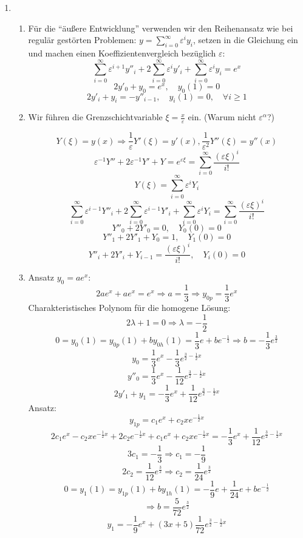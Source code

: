 \documentclass[a4paper,11pt]{scrartcl}
\newcommand*{\eps}{\varepsilon}
\newcommand*{\sm}{\sum_{i=0}^\infty}
\begin{document}
\begin{enumerate}[label*=\textbf{8.\arabic*.}]

\item \begin{enumerate}
  \item
    Für die ``äußere Entwicklung'' verwenden wir den Reihenansatz wie bei regulär gestörten Problemen:
    $y = \sm \eps^i y_i$, setzen in die Gleichung ein und machen einen
    Koeffizientenvergleich bezüglich $\eps$:
    \[ \sm \eps^{i+1} y''_i + 2 \sm \eps^{i} y'_i + \sm \eps^i y_i = e^x \]
    \[ 2y'_0 + y_0 = e^x, \quad y_0(1)=0 \]
    \[ 2y'_i + y_i = -y''_{i-1}, \quad y_i(1)=0, \quad \forall i \geq 1\]

  \item
    Wir führen die Grenzschichtvariable $\xi = \frac{x}{\eps}$ ein. (Warum nicht
    $\eps^\alpha$?)

    \[Y(\xi) = y(x) \Rightarrow \frac{1}{\eps} Y'(\xi) = y'(x),
      \frac{1}{\eps^2} Y''(\xi) = y''(x)\]
    \[\eps^{-1} Y'' + 2 \eps^{-1} Y' + Y = e^{\eps \xi} = \sm \frac{(\eps \xi)^i}{i!}\]
    \[Y(\xi) = \sm \eps^i Y_i\]
    \[\sm \eps^{i-1} Y''_i + 2 \sm \eps^{i-1} Y'_i + \sm \eps^i Y_i = \sm
      \frac{(\eps \xi)^i}{i!}\]
    \[ Y''_0 + 2 Y'_0 = 0, \quad Y_0(0) = 0\]
    \[ Y''_1 + 2 Y'_1 + Y_0 = 1, \quad Y_1(0) = 0\]
    \[ Y''_i + 2 Y'_i + Y_{i-1} = \frac{(\eps \xi)^i}{i!}, \quad Y_i(0) = 0\]

  \item
    Ansatz $y_0 = a e^x$:
    \[2ae^x + a e^x = e^x \Rightarrow a = \frac{1}{3} \Rightarrow y_{0p} =
      \frac{1}{3}e^x \]
    Charakteristisches Polynom für die homogene Lösung: 
    \[2 \lambda + 1 = 0 \Rightarrow \lambda=-\frac{1}{2}\]
    \[0 = y_0(1) = y_{0p}(1) + b y_{0h}(1) = \frac{1}{3} e + b e^{-\frac{1}{2}}
      \Rightarrow b = - \frac{1}{3} e^{\frac{3}{2}} \]
    \[y_0 = \frac{1}{3}e^x - \frac{1}{3} e^{\frac{3}{2} - \frac{1}{2}x}\]
    \[y''_0 = \frac{1}{3}e^x - \frac{1}{12} e^{\frac{3}{2} - \frac{1}{2}x}\]
    \[ 2 y'_1 + y_1 = -\frac{1}{3} e^x + \frac{1}{12}e^{\frac{3}{2} - \frac{1}{2}x}\]
    Ansatz:
    \[y_{1p} = c_1 e^x + c_2 x e^{-\frac{1}{2}x}\]
    \[2 c_1 e^x - c_2 x e^{-\frac{1}{2}x} + 2c_2 e^{-\frac{1}{2}x} + c_1 e^x +
      c_2 x e^{-\frac{1}{2} x}=  -\frac{1}{3} e^x + \frac{1}{12}e^{\frac{3}{2} - \frac{1}{2}x}\]
    \[3c_1 = -\frac{1}{3} \Rightarrow c_1 = -\frac{1}{9}\]
    \[2c_2 = \frac{1}{12} e^{\frac{3}{2}} \Rightarrow c_2 = \frac{1}{24}e^{\frac{3}{2}}\]
    \[0 = y_1(1) = y_{1p}(1) + b y_{1h}(1) = -\frac{1}{9}e + \frac{1}{24} e + b
      e^{-\frac{1}{2}} \]
    \[\Rightarrow b = \frac{5}{72} e^{\frac{3}{2}} \]
    \[y_1 = -\frac{1}{9}e^x +  (3x + 5) \frac{1}{72}e^{\frac{3}{2}-\frac{1}{2}x} \]


\end{enumerate}
\end{enumerate}
\end{document}

